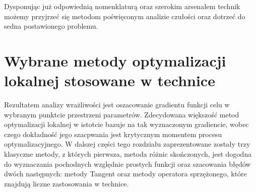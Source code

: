 \documentclass[12pt]{article}
\begin{document}
Dysponując już odpowiednią nomenklaturą oraz szerokim arsenałem technik możemy przyjrzeć się metodom poświęconym analizie czułości oraz dotrzeć do sedna postawionego problemu. 
\newpage
\section{Wybrane metody optymalizacji lokalnej stosowane w technice}
Rezultatem analizy wrażliwości jest oszacowanie gradientu funkcji celu w wybranym punktcie przestrzeni parametrów. Zdecydowana większość metod optymalizacji lokalnej w istotcie bazuje na tak wyznaczonym gradiencie, wobec czego dokładność jego szacpwania jest krytycznym momentem procesu optymalizacyjnego. W dalszej części tego rozdziału zaprezentowane zostały trzy klasyczne metody, z których pierwsza, metoda różnic skończonych, jest dogodna do wyznaczania pochodnych względnie prostych funkcji oraz szacowania błędów dwóch następnych: metody Tangent oraz metody operatora sprzężonego, które znajdują liczne zastosowania w technice.
\end{document}
